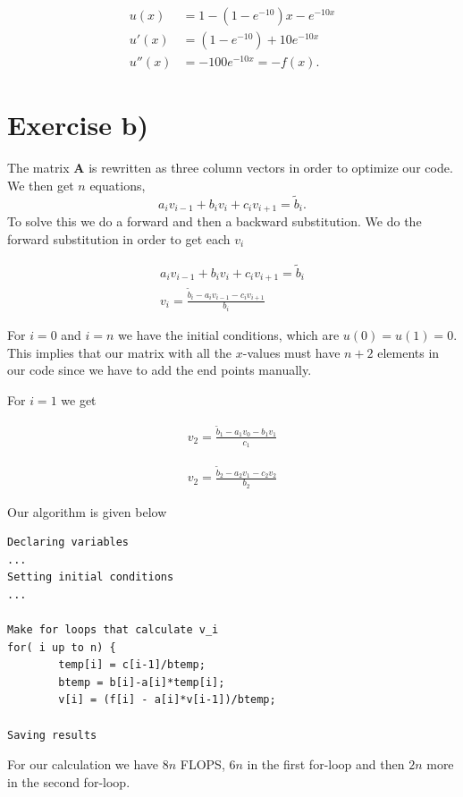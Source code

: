 \documentclass[english, 11pt]{article}
\begin{document}
\begin{align*}
	u(x) &= 1-(1-e^{-10})x - e^{-10x} \\
	u'(x) &= (1-e^{-10}) + 10e^{-10x} \\
	u''(x) &= - 100e^{-10x} = -f(x).
\end{align*}

\section*{Exercise b)}

The matrix $\mathbf A$ is rewritten as three column vectors in order to optimize our code. We then get $n$ equations,
$$ a_i v_{i-1} + b_iv_i + c_i v_{i+1} = \tilde b_i.$$
To solve this we do a forward and then a backward substitution. We do the forward substitution in order to get each $v_i$

\begin{align*}
	a_i v_{i-1} + b_iv_i + c_i v_{i+1} =  \tilde b_i \\
	v_i = \frac{\tilde b_i - a_i v_{i-1} - c_i v_{i+1}}{b_i} 
\end{align*}

For $i=0$ and $i=n$ we have the initial conditions, which are $u(0) = u(1)=0$. This implies that our matrix with all the $x$-values must have $n+2$ elements in our code since we have to add the end points manually.

For $i=1$ we get

\begin{align*}
	v_2 =  \frac{\tilde b_1 - a_1 v_0 - b_1v_1}{c_1} 
\end{align*}

\begin{align*}
	v_2 = \frac{\tilde b_2 - a_2 v_1 - c_2 v_{2}}{b_2} 
\end{align*}

Our algorithm is given below

\begin{lstlisting}
Declaring variables
...
Setting initial conditions
...

Make for loops that calculate v_i
for( i up to n) {
        temp[i] = c[i-1]/btemp;
        btemp = b[i]-a[i]*temp[i];
        v[i] = (f[i] - a[i]*v[i-1])/btemp;

Saving results

\end{lstlisting}

For our calculation we have $8n$ FLOPS, $6n$ in the first for-loop and then $2n$ more in the second for-loop.
\end{document}
